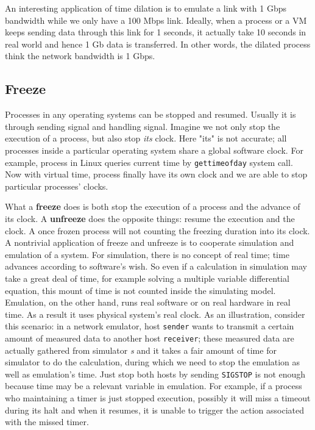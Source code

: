 \documentclass{acm_proc_article-sp}
\begin{document}
An interesting application of time dilation is to emulate a link with 1 Gbps bandwidth while we only have a 100 Mbps link. Ideally, when a process or a VM keeps sending data through this link for 1 seconds, it actually take 10 seconds in real world and hence 1 Gb data is transferred. In other words, the dilated process think the network bandwidth is 1 Gbps.

\subsection{Freeze}
Processes in any operating systems can be stopped and resumed. Usually it is through sending signal and handling signal. Imagine we not only stop the execution of a process, but also stop \textit{its} clock. 
Here "its" is not accurate; all processes inside a particular operating system share a global software clock. 
For example, process in Linux queries current time by \texttt{gettimeofday} system call. 
Now with virtual time, process finally have its own clock and we are able to stop particular processes' clocks.

What a \textbf{freeze} does is both stop the execution of a process and the advance of its clock. 
A \textbf{unfreeze} does the opposite things: resume the execution and the clock. 
A once frozen process will not counting the freezing duration into its clock. 
A nontrivial application of freeze and unfreeze is to cooperate simulation and emulation of a system. 
For simulation, there is no concept of real time; time advances according to software's wish. 
So even if a calculation in simulation may take a great deal of time, for example solving a multiple variable differential equation, this mount of time is not counted inside the simulating model. 
Emulation, on the other hand, runs real software or on real hardware in real time. As a result it uses physical system's real clock. 
As an illustration, consider this scenario: in a network emulator, host \texttt{sender} wants to transmit a certain amount of measured data to another host \texttt{receiver}; these measured data are actually gathered from simulator \textit{s} and it takes a fair amount of time for simulator to do the calculation, during which we need to stop the emulation as well as emulation's time. 
Just stop both hosts by sending \texttt{SIGSTOP} is not enough because time may be a relevant variable in emulation. For example, if a process who maintaining a timer is just stopped execution, possibly it will miss a timeout during its halt and when it resumes, it is unable to trigger the action associated with the missed timer.
\end{document}
